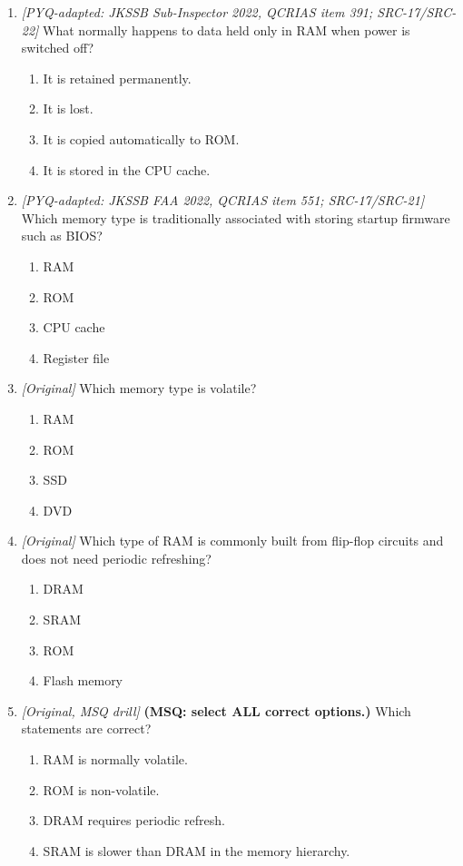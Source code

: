 \begin{enumerate}[label=\textbf{Q\arabic*.}, leftmargin=*]
\begin{enumerate}[label=\Alph*.]
    \item ROM loses its contents when power goes off.
  \end{enumerate}
\item \textit{[PYQ-adapted: JKSSB Sub-Inspector 2022, QCRIAS item 391; SRC-17/SRC-22]} What normally happens to data held only in RAM when power is switched off?
  \begin{enumerate}[label=\Alph*.]
\item It is retained permanently.
   \item It is lost.
   \item It is copied automatically to ROM.
   \item It is stored in the CPU cache.
  \end{enumerate}

\item \textit{[PYQ-adapted: JKSSB FAA 2022, QCRIAS item 551; SRC-17/SRC-21]} Which memory type is traditionally associated with storing startup firmware such as BIOS?
  \begin{enumerate}[label=\Alph*.]
\item RAM
   \item ROM
   \item CPU cache
   \item Register file
  \end{enumerate}

\item \textit{[Original]} Which memory type is volatile?
  \begin{enumerate}[label=\Alph*.]
\item RAM
   \item ROM
   \item SSD
   \item DVD
  \end{enumerate}

\item \textit{[Original]} Which type of RAM is commonly built from flip-flop circuits and does not need periodic refreshing?
  \begin{enumerate}[label=\Alph*.]
\item DRAM
   \item SRAM
   \item ROM
   \item Flash memory
  \end{enumerate}

\item \textit{[Original, MSQ drill]} \textbf{(MSQ: select ALL correct options.)} Which statements are correct?
  \begin{enumerate}[label=\Alph*.]
\item RAM is normally volatile.
   \item ROM is non-volatile.
   \item DRAM requires periodic refresh.
   \item SRAM is slower than DRAM in the memory hierarchy.
  \end{enumerate}

\end{enumerate}
